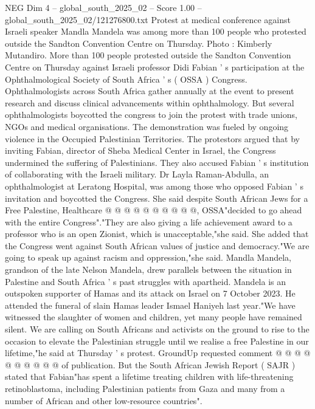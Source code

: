 \begin{textsample}{NEG Dim 4 – global\_south\_2025\_02 – Score 1.00 – global\_south\_2025\_02/121276800.txt}  \label{ex:f4_neg_440}
Protest at medical conference against Israeli speaker Mandla Mandela was among more than 100 people who protested outside the Sandton Convention Centre on Thursday.
Photo : Kimberly Mutandiro.
More than 100 people protested outside the Sandton Convention Centre on Thursday against Israeli professor Didi Fabian ' s participation at the Ophthalmological Society of South Africa ' s ( OSSA ) Congress.
Ophthalmologists across South Africa gather annually at the event to present research and discuss clinical advancements within ophthalmology.
But several ophthalmologists boycotted the congress to join the protest with trade unions, NGOs and medical organisations.
The demonstration was fueled by ongoing violence in the Occupied Palestinian Territories.
The protestors argued that by inviting Fabian, director of Sheba Medical Center in Israel, the Congress undermined the suffering of Palestinians.
They also accused Fabian ' s institution of collaborating with the Israeli military.
Dr Layla Raman-Abdulla, an ophthalmologist at Leratong Hospital, was among those who opposed Fabian ' s invitation and boycotted the Congress.
She said despite South African Jews for a Free Palestine, Healthcare @ @ @ @ @ @ @ @ @ @, OSSA"decided to go ahead with the entire Congress"."They are also giving a life achievement award to a professor who is an open Zionist, which is unacceptable,"she said.
She added that the Congress went against South African values of justice and democracy."We are going to speak up against racism and oppression,"she said.
Mandla Mandela, grandson of the late Nelson Mandela, drew parallels between the situation in Palestine and South Africa ' s past struggles with apartheid.
Mandela is an outspoken supporter of Hamas and its attack on Israel on 7 October 2023.
He attended the funeral of slain Hamas leader Ismael Haniyeh last year."We have witnessed the slaughter of women and children, yet many people have remained silent.
We are calling on South Africans and activists on the ground to rise to the occasion to elevate the Palestinian struggle until we realise a free Palestine in our lifetime,"he said at Thursday ' s protest.
GroundUp requested comment @ @ @ @ @ @ @ @ @ @ of publication.
But the South African Jewish Report ( SAJR ) stated that Fabian"has spent a lifetime treating children with life-threatening retinoblastoma, including Palestinian patients from Gaza and many from a number of African and other low-resource countries".

\end{textsample}
